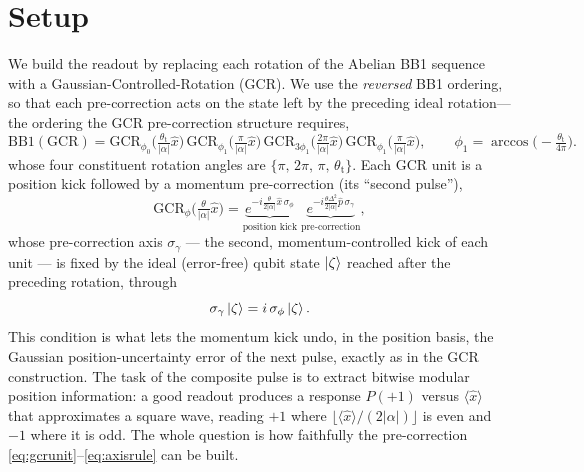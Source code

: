 \documentclass[11pt]{article}
\newcommand{\GCR}{\mathrm{GCR}}
\begin{document}
\section{Setup}
We build the readout by replacing each rotation of the Abelian BB1 sequence with a
Gaussian-Controlled-Rotation (GCR). We use the \emph{reversed} BB1 ordering, so that each
pre-correction acts on the state left by the preceding ideal rotation---the ordering the GCR
pre-correction structure requires,
\begin{equation}
\mathrm{BB1(GCR)}=
\GCR_{\phi_0}\!\Big(\tfrac{\theta_\mathrm{t}}{|\alpha|}\hat x\Big)\,
\GCR_{\phi_1}\!\Big(\tfrac{\pi}{|\alpha|}\hat x\Big)\,
\GCR_{3\phi_1}\!\Big(\tfrac{2\pi}{|\alpha|}\hat x\Big)\,
\GCR_{\phi_1}\!\Big(\tfrac{\pi}{|\alpha|}\hat x\Big),\qquad
\phi_1=\arccos\!\big(-\tfrac{\theta_\mathrm{t}}{4\pi}\big).
\label{eq:bb1gcr}
\end{equation}
whose four constituent rotation angles are $\{\pi,\,2\pi,\,\pi,\,\theta_\mathrm{t}\}$. Each GCR unit is a
position kick followed by a momentum pre-correction (its ``second pulse''),
\begin{equation}
\GCR_\phi\!\Big(\tfrac{\theta}{|\alpha|}\hat x\Big)
= \underbrace{e^{-i\frac{\theta}{2|\alpha|}\hat x\,\sigma_\phi}}_{\text{position kick}}\;
  \underbrace{e^{-i\frac{\theta\Delta^2}{2|\alpha|}\hat p\,\sigma_\gamma}}_{\text{pre-correction}},
\label{eq:gcrunit}
\end{equation}
whose pre-correction axis $\sigma_\gamma$ --- the second, momentum-controlled kick of each unit --- is
fixed by the ideal (error-free) qubit state $\ket{\zeta}$ reached after the preceding rotation, through
\begin{equation}
\sigma_\gamma\ket{\zeta}=i\,\sigma_\phi\ket{\zeta}.
\label{eq:axisrule}
\end{equation}
This condition is what lets the momentum kick undo, in the position basis, the Gaussian
position-uncertainty error of the next pulse, exactly as in the GCR construction. The task of the
composite pulse is to extract bitwise modular position information: a good readout produces a response
$P(+1)$ versus $\langle\hat x\rangle$ that approximates a square wave, reading $+1$ where
$\lfloor\langle\hat x\rangle/(2|\alpha|)\rfloor$ is even and $-1$ where it is odd. The whole question is
how faithfully the pre-correction \eqref{eq:gcrunit}--\eqref{eq:axisrule} can be built.
\end{document}
